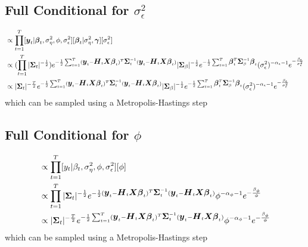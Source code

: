 \documentclass[fleqn]{article}
\def\bm#1{\mbox{\boldmath $#1$}}
\begin{document}
\subsection{Full Conditional for $\sigma^2_\epsilon$}
%
\begin{align*}
[\sigma^2_\epsilon | \cdot] & \propto \prod_{t = 1}^T [\bm{y}_t | \bm{\beta}_t, \sigma^2_\eta, \phi, \sigma^2_\epsilon] [\bm{\beta}_t | \sigma^2_\eta, \bm{\gamma}] [\sigma^2_\epsilon]\\
%
& \propto (\prod_{t = 1}^T |\bm{\Sigma}_t |^{ - \frac{1} {2}}) e^{ - \frac{1} {2} \sum_{t = 1}^T (\bm{y}_t - \bm{H}_t \bm{X} \bm{\beta}_t)^T \bm{\Sigma}_t^{ - 1} (\bm{y}_t - \bm{H}_t \bm{X} \bm{\beta}_t)} |\bm{\Sigma}_\beta |^{ - \frac{1} {2}} e^{ - \frac{1} {2} \sum_{t = 1}^T \bm{\beta}_t^T \bm{\Sigma}_{\beta}^{ - 1} \bm{\beta}_t} (\sigma^2_\epsilon)^{ - \alpha_\epsilon - 1} e^{ - \frac{\beta_\epsilon} {\sigma^2_\epsilon}}\\
%
& \propto |\bm{\Sigma}_t |^{ - \frac{T} {2}} e^{ - \frac{1} {2} \sum_{t = 1}^T (\bm{y}_t - \bm{H}_t \bm{X} \bm{\beta}_t)^T \bm{\Sigma}_t^{ - 1} (\bm{y}_t - \bm{H}_t \bm{X} \bm{\beta}_t)} |\bm{\Sigma}_\beta |^{ - \frac{1} {2}} e^{ - \frac{1} {2} \sum_{t = 1}^T \bm{\beta}_t^T \bm{\Sigma}_{\beta}^{ - 1} \bm{\beta}_t} (\sigma^2_\epsilon)^{ - \alpha_\epsilon - 1} e^{ - \frac{\beta_\epsilon} {\sigma^2_\epsilon}}\\
\end{align*}
% 
which can be sampled using a Metropolis-Hastings step
%
\subsection{Full Conditional for $\phi$}
%
\begin{align*}
  [\phi | \cdot] & \propto \prod_{t = 1}^T [y_t | \beta_t, \sigma^2_\eta, \phi, \sigma^2_\epsilon] [\phi]\\
%
& \propto \prod_{t = 1}^T | \bm{\Sigma}_t |^{ - \frac{1} {2}} e^{ - \frac{1} {2} (\bm{y}_t - \bm{H}_t \bm{X} \bm{\beta}_t)^T \bm{\Sigma}_t^{ - 1} (\bm{y}_t - \bm{H}_t \bm{X} \bm{\beta}_t)} \phi^{ - \alpha_\phi - 1} e^{ - \frac{\beta_\phi} {\phi}}\\
%
& \propto | \bm{\Sigma}_t |^{ - \frac{T} {2}} e^{ - \frac{1} {2} \sum_{t = 1}^T (\bm{y}_t - \bm{H}_t \bm{X} \bm{\beta}_t)^T \bm{\Sigma}_t^{ - 1} (\bm{y}_t - \bm{H}_t \bm{X} \bm{\beta}_t)} \phi^{ - \alpha_\phi - 1} e^{ - \frac{\beta_\phi} {\phi}}\\
\end{align*}
% 
which can be sampled using a Metropolis-Hastings step
%
\end{document}
